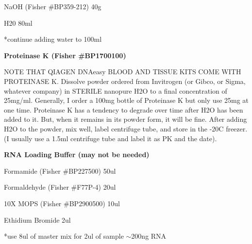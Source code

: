 \documentclass[11pt, oneside]{article}
\begin{document}
			\hspace{2mm}NaOH \hspace{2mm} (Fisher \#BP359-212) \hspace{5mm}	40g	

			\hspace{2mm}H20	\hspace{50mm}					80ml

			\hspace{2mm}*continue adding water to 100ml

		\vspace{5mm}

		{\bf Proteinase K (Fisher \#BP1700100)}

		\begin{adjustwidth}{0.25in}{0pt} NOTE THAT QIAGEN DNAeasy BLOOD AND TISSUE KITS COME WITH PROTEINASE K. Dissolve powder ordered from Invitrogen (or Gibco, or Sigma, whatever company) in STERILE nanopure H2O to 		a final concentration of 25mg/ml. Generally, I order a 100mg bottle of Proteinase K but only use 25mg at one time. Proteinase K has a tendency 		to degrade over time after H2O has been added to it. But, when it remains in its powder form, it will be fine. After adding H2O to the powder, mix 		well, label centrifuge tube, and store in the -20C freezer. (I usually use a 1.5ml centrifuge tube and label it as PK and the date). 
		\end{adjustwidth}

		\vspace{5mm}

		{\bf RNA Loading Buffer (may not be needed)}

			\hspace{2mm}Formamide \hspace{9mm}	(Fisher \#BP227500)	\hspace{5mm}	50ul

			\hspace{2mm}Formaldehyde \hspace{5mm}	(Fisher \#F77P-4)	\hspace{9mm}	20ul

			\hspace{2mm}10X MOPS 	\hspace{9mm}	(Fisher \#BP2900500) \hspace{3mm}	10ul

			\hspace{2mm}Ethidium Bromide	\hspace{40mm}					2ul

			\hspace{2mm}*use 8ul of master mix for 2ul of sample $\sim$200ng RNA
\end{document}
